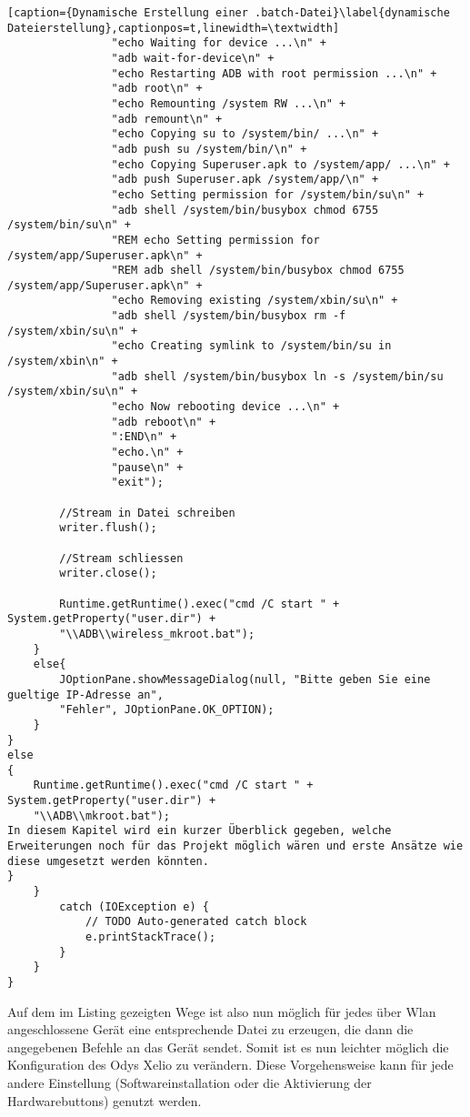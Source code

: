 \begin{flushleft}
\begin{lstlisting}[caption={Dynamische Erstellung einer .batch-Datei}\label{dynamische Dateierstellung},captionpos=t,linewidth=\textwidth]
				"echo Waiting for device ...\n" +
				"adb wait-for-device\n" +
				"echo Restarting ADB with root permission ...\n" +
				"adb root\n" +
				"echo Remounting /system RW ...\n" +
				"adb remount\n" +
				"echo Copying su to /system/bin/ ...\n" +
				"adb push su /system/bin/\n" +
				"echo Copying Superuser.apk to /system/app/ ...\n" +
				"adb push Superuser.apk /system/app/\n" +
				"echo Setting permission for /system/bin/su\n" +
				"adb shell /system/bin/busybox chmod 6755 /system/bin/su\n" +
				"REM echo Setting permission for /system/app/Superuser.apk\n" +
				"REM adb shell /system/bin/busybox chmod 6755 /system/app/Superuser.apk\n" +
				"echo Removing existing /system/xbin/su\n" +
				"adb shell /system/bin/busybox rm -f /system/xbin/su\n" +
				"echo Creating symlink to /system/bin/su in /system/xbin\n" +
				"adb shell /system/bin/busybox ln -s /system/bin/su /system/xbin/su\n" +
				"echo Now rebooting device ...\n" +
				"adb reboot\n" +
				":END\n" +
				"echo.\n" +
				"pause\n" +
				"exit");
				
		//Stream in Datei schreiben
		writer.flush();
								
		//Stream schliessen
		writer.close();
								
		Runtime.getRuntime().exec("cmd /C start " + System.getProperty("user.dir") + 
		"\\ADB\\wireless_mkroot.bat");
	}
	else{
		JOptionPane.showMessageDialog(null, "Bitte geben Sie eine gueltige IP-Adresse an", 
		"Fehler", JOptionPane.OK_OPTION);
	}
}
else
{
	Runtime.getRuntime().exec("cmd /C start " + System.getProperty("user.dir") + 
	"\\ADB\\mkroot.bat");
In diesem Kapitel wird ein kurzer Überblick gegeben, welche Erweiterungen noch für das Projekt möglich wären und erste Ansätze wie diese umgesetzt werden könnten. 
}	
	}
		catch (IOException e) {
			// TODO Auto-generated catch block
			e.printStackTrace();
		}
	}
}
\end{lstlisting}

Auf dem im Listing gezeigten Wege ist also nun möglich für jedes über Wlan angeschlossene Gerät eine entsprechende Datei zu erzeugen, die dann die angegebenen Befehle an das Gerät sendet. Somit ist es nun leichter möglich die Konfiguration des Odys Xelio zu verändern. Diese Vorgehensweise kann für jede andere Einstellung (Softwareinstallation oder die Aktivierung der Hardwarebuttons) genutzt werden. 


\end{flushleft}
